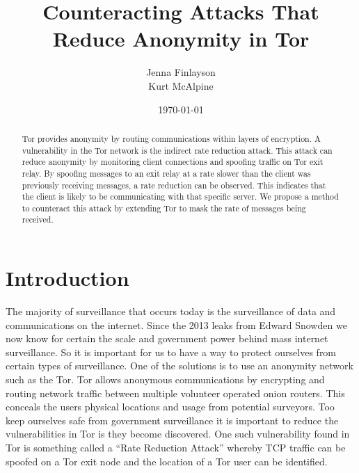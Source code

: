 \documentclass[9pt,technote]{IEEEtran}
\title{Counteracting Attacks That Reduce Anonymity in Tor}
\date{\today}
\author{Jenna Finlayson\\Kurt McAlpine}
\begin{document}
\maketitle

\begin{abstract}
Tor provides anonymity by routing communications within layers of encryption. A
vulnerability in the Tor network is the indirect rate reduction attack. This
attack can reduce anonymity by monitoring client connections and spoofing
traffic on Tor exit relay. By spoofing messages to an exit relay at a rate
slower than the client was previously receiving messages, a rate reduction can
be observed. This indicates that the client is likely to be communicating with
that specific server. We propose a method to counteract this attack by
extending Tor to mask the rate of messages being received.
\end{abstract}

\section{Introduction}

The majority of surveillance that occurs today is the surveillance of data and
communications on the internet\cite{diffie2008brave}. Since the 2013 leaks from
Edward Snowden we now know for certain the scale and government power behind
mass internet surveillance. So it is important for us to have a way to protect
ourselves from certain types of surveillance. One of the solutions is to use an
anonymity network such as the Tor. Tor allows anonymous communications by
encrypting and routing network traffic between multiple volunteer operated
onion routers. This conceals the users physical locations and usage from
potential surveyors. Too keep ourselves safe from government surveillance it is
important to reduce the vulnerabilities in Tor is they become discovered. One
such vulnerability found in Tor is something called a ``Rate Reduction Attack''
whereby TCP traffic can be spoofed on a Tor exit node and the location of a Tor
user can be identified\cite{gilad2012spying}.

\cite{hayesguard}\cite{gilad2012spying}\cite{sun2015raptor}\cite{biryukov2012torscan}\cite{jansen2014sniper}




\end{document}
